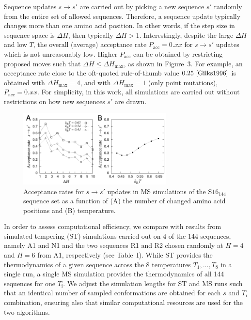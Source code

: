 \documentclass[
aip,
rsi,%
amsmath,amssymb,
reprint,%
]{revtex4-1}
\newcommand	 {\sbar}	{{s}}
\newcommand {\SR}		{${\mathrm{S16}_{144}}$}
\begin{document}
Sequence updates $\sbar\rightarrow\sbar'$ are carried out by picking a new sequence $\sbar'$ randomly from the entire set of allowed sequences. Therefore, a sequence update typically changes more than one amino acid position. In other words, if the step size in sequence space is $\Delta H$, then typically $\Delta H>1$. Interestingly, despite the large $\Delta H$ and low $T$, the overall (average) acceptance rate $P_\mathrm{acc}=0.xx$ for $\sbar\rightarrow\sbar'$ updates which is not unreasonably low. Higher $P_\mathrm{acc}$ can be obtained by restricting proposed moves such that $\Delta H\le\Delta H_\mathrm{max}$, as shown in Figure~3. For example, an acceptance rate close to the oft-quoted rule-of-thumb value $0.25~\cite{Gilks1996} $ is obtained with $\Delta H_\mathrm{max}=4$, and with $\Delta H_\mathrm{max} = 1$ (only point mutations), $P_\mathrm{acc}=0.xx$. For simplicity, in this work, all simulations are carried out without restrictions on how new sequences $\sbar'$ are drawn. 

\begin{figure}
\includegraphics[width=7.8cm]{Pacc}
\caption{Acceptance rates for $\sbar\rightarrow\sbar'$ updates in MS simulations of the {\SR} sequence set as a function of (A) the number of changed amino acid positions  and (B) temperature. }
\end{figure}

In order to assess computational efficiency, we compare with results from simulated tempering (ST) simulations carried out on 4 of the 144 sequences, namely A1 and N1 and the two sequences R1 and R2 chosen randomly at $H=4$ and $H=6$ from A1, respectively (see Table~I). While ST provides the thermodynamics of a given sequence across the 8 temperatures $T_1, ..., T_8$ in a single run, a single MS simulation provides the thermodynamics of all 144 sequences for one $T_\mathrm{i}$. We adjust the simulation lengths for ST and MS runs such that an identical number of sampled conformations are obtained for each $\sbar$ and $T_\mathrm{i}$ combination, ensuring also that similar computational resources are used for the two algorithms. 
\end{document}
